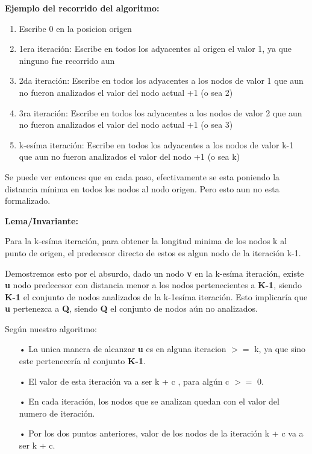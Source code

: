 \documentclass[10pt,a4paper]{article}
\begin{document}
\textbf{Ejemplo del recorrido del algoritmo:}

\begin{enumerate}
\item Escribe 0 en la posicion origen
\item 1era iteración: Escribe en todos los adyacentes al origen el valor 1, ya que ninguno fue recorrido aun
\item 2da iteración: Escribe en todos los adyacentes a los nodos de valor 1 que aun no fueron analizados el valor del nodo actual +1 (o sea 2)
\item 3ra iteración: Escribe en todos los adyacentes a los nodos de valor 2 que aun no fueron analizados el valor del nodo actual +1 (o sea 3)
\item k-esíma iteración: Escribe en todos los adyacentes a los nodos de valor k-1 que aun no fueron analizados el valor del nodo +1 (o sea k)
\end{enumerate}

Se puede ver entonces que en cada paso, efectivamente se esta poniendo la distancia mínima en todos los nodos al nodo origen. Pero esto aun no esta formalizado.

\bigskip
\textbf{Lema/Invariante:}

Para la k-esíma iteración, para obtener la longitud minima de los nodos k al punto de origen, el predecesor directo de estos es algun nodo de la iteración k-1.

Demostremos esto por el absurdo, dado un nodo \textbf{v} en la k-esíma iteración, existe \textbf{u} nodo predecesor con distancia menor a los nodos pertenecientes a \textbf{K-1}, siendo \textbf{K-1} el conjunto de nodos analizados de la k-1esíma iteración. Esto implicaría que \textbf{u} pertenezca a \textbf{Q}, siendo \textbf{Q} el conjunto de nodos aún no analizados.

Según nuestro algoritmo: 
\begin{itemize}
\item[•]La unica manera de alcanzar \textbf{u} es en alguna iteracion $>=$ k, ya que sino este pertenecería al conjunto \textbf{K-1}.
\item[•]El valor de esta iteración va a ser k + c , para algún c $>=$ 0.
\item[•]En cada iteración, los nodos que se analizan quedan con el valor del numero de iteración.
\item[•]Por los dos puntos anteriores, valor de los nodos de la iteración k + c va a ser k + c. 
\end{itemize}
\end{document}
